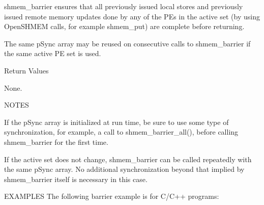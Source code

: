        shmem_barrier  ensures  that  all  previously  issued  local stores and
       previously issued remote memory updates done by any of the PEs  in  the
       active  set  (by	 using	OpenSHMEM  calls,  for  example  shmem_put) are
       complete before returning.

       The  same  pSync	 array	may  be	 reused	 on   consecutive   calls   to
       shmem_barrier if the same active PE set is used.

Return Values
  
	None.

NOTES

       If the pSync array is initialized at run time, be sure to use some type
       of synchronization, for example, a call to shmem_barrier_all(), before
       calling shmem_barrier for the first time.

       If  the	active	set  does  not	change,	 shmem_barrier	can  be called
       repeatedly with the same pSync array.   No  additional  synchronization
       beyond  that implied by shmem_barrier itself is necessary in this case.

EXAMPLES
	The following barrier example is for C/C++ programs:

       

